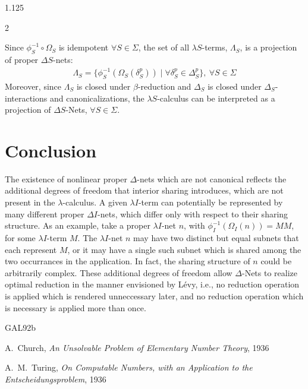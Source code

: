 \documentclass[10pt]{article}
\begin{document}
\begin{spacing}{1.125}
\begin{multicols}{2}
\begin{theorem}
Since \mbox{$\phi_S^{-1} \circ \Omega_S$} is idempotent \mbox{$\forall S \in \Sigma$}, the set of all \mbox{$\lambda S$-terms}, \mbox{$\Lambda_S$}, is a projection of proper \mbox{$\Delta S$-nets}:
\vspace{-0.05cm}
\begin{align*}
  \Lambda_S = \{\phi_S^{-1}(\Omega_S(\delta_S^p)) \mid \forall \delta_S^p \in \Delta_S^{p} \},\  \forall S \in \Sigma
\end{align*}
Moreover, since \mbox{$\Lambda_S$} is closed under \mbox{$\beta$-reduction} and \mbox{$\Delta_S$} is closed under \mbox{$\Delta_S$-interactions} and canonicalizations, the \mbox{$\lambda S$-calculus} can be interpreted as a projection of \mbox{$\Delta S$-Nets}, \mbox{$\forall S \in \Sigma$}.
\end{theorem}

\vspace{-0.1cm}
\section{Conclusion}

The existence of nonlinear proper \mbox{$\Delta$-nets} which are not canonical reflects the additional degrees of freedom that interior sharing introduces, which are not present in the \mbox{$\lambda$-calculus}.
A given \mbox{$\lambda I$-term} can potentially be represented by many different proper \mbox{$\Delta I$-nets}, which differ only with respect to their sharing structure.
As an example, take a proper \mbox{$\lambda I$-net} $n$, with \mbox{$\phi_I^{-1}(\Omega_I(n)) = M M$}, for some \mbox{$\lambda I$-term} $M$.
The \mbox{$\lambda I$-net} $n$ may have two distinct but equal subnets that each represent $M$, or it may have a single such subnet which is shared among the two occurrances in the application.
In fact, the sharing structure of $n$ could be arbitrarily complex.
These additional degrees of freedom allow \mbox{$\Delta$-Nets} to realize optimal reduction in the manner envisioned by Lévy, i.e., no reduction operation is applied which is rendered unneccessary later, and no reduction operation which is necessary is applied more than once.

\begin{thebibliography}{GAL92b}  %

  A.~Church,
  \emph{An Unsolvable Problem of Elementary Number Theory},
  1936

  A.~M.~Turing,
  \emph{On Computable Numbers, with an Application to the Entscheidungsproblem},
  1936


\end{thebibliography}
\end{multicols}
\end{spacing}
\end{document}
